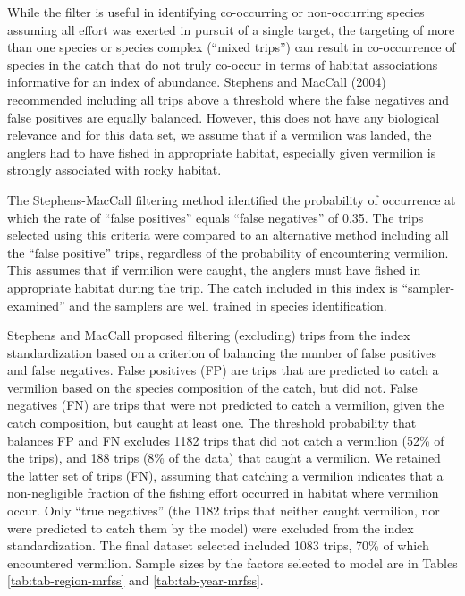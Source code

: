 \documentclass[
  english,
  a4paper,
]{article}
\begin{document}
While the filter is useful in identifying co-occurring or non-occurring species
assuming all effort was exerted in pursuit of a single target, the targeting of
more than one species or species complex (``mixed trips'') can result in co-occurrence of species in the catch
that do not truly co-occur in terms of habitat
associations informative for an index of abundance. Stephens and MacCall
(2004) recommended including all trips above a threshold where the
false negatives and false positives are equally balanced. However, this does
not have any biological relevance and for this data set, we assume that if a
vermilion was landed, the anglers had to have fished in appropriate habitat,
especially given vermilion is strongly associated with rocky habitat.

The Stephens-MacCall filtering method identified the probability of occurrence
at which the rate of ``false
positives'' equals ``false negatives'' of 0.35. The
trips selected using this criteria were compared to an alternative method
including all the ``false positive'' trips, regardless of the probability of
encountering vermilion.
This assumes that if vermilion were caught, the anglers must have fished in
appropriate habitat during the trip. The catch included in this index is
``sampler-examined'' and the samplers are well trained in species identification.

Stephens and MacCall proposed filtering (excluding) trips from the index
standardization based on a criterion of balancing the number of false positives
and false negatives. False positives (FP) are trips that are predicted to catch
a vermilion based on the species composition of the catch, but did not. False
negatives (FN) are trips that were not predicted to catch a vermilion, given the
catch composition, but caught at least one. The threshold probability that
balances FP and FN excludes
1182
trips that did not catch a vermilion (52\%
of the trips), and 188
trips (8\% of the data) that
caught a vermilion. We retained the latter set of trips (FN), assuming that
catching a vermilion indicates that a non-negligible fraction of the fishing
effort occurred in habitat where vermilion occur. Only ``true negatives''
(the 1182
trips that neither caught vermilion, nor were predicted to catch them by the model)
were excluded from the index standardization. The final dataset selected included
1083 trips, 70\%
of which encountered vermilion. Sample sizes by the factors selected to model are in Tables
\ref{tab:tab-region-mrfss} and \ref{tab:tab-year-mrfss}.
\end{document}
